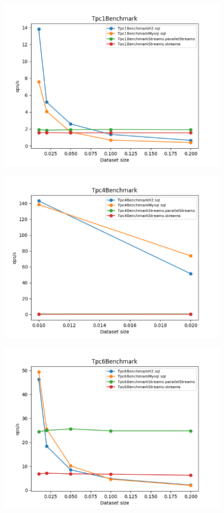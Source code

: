 \documentclass[12pt]{extarticle}
\begin{document}
\begin{figure}[H]
\centering
\includegraphics[width=13cm]{plots/Tpc1Benchmark}
\end{figure}

\begin{figure}[H]
\centering
\includegraphics[width=13cm]{plots/Tpc4Benchmark}
\end{figure}

\begin{figure}[H]
\centering
\includegraphics[width=13cm]{plots/Tpc6Benchmark}
\end{figure}
\end{document}
